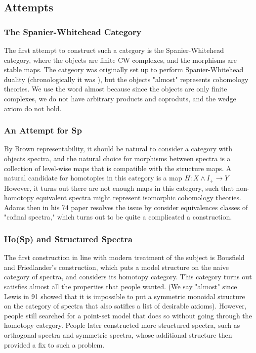 \documentclass{article}
\theoremstyle{definition}
\theoremstyle{definition}
\theoremstyle{definition}
\theoremstyle{definition}
\theoremstyle{definition}
\theoremstyle{definition}
\theoremstyle{definition}
\begin{document}
\subsection{Attempts}

\subsubsection{The Spanier-Whitehead Category}
The first attempt to construct such a category is the Spanier-Whitehead category, where the objects are finite CW complexes, and the morphisms are stable maps. The catgeory was originally set up to perform Spanier-Whitehead duality (chronologically it was ), but the objects "almost" represents cohomology theories. We use the word almost because since the objects are only finite complexes, we do not have arbitrary products and coproduts, and the wedge axiom do not hold. 
\subsubsection{An Attempt for \textrm{Sp}}
By Brown representability, it should be natural to consider a category with objects spectra, and the natural choice for morphisms between spectra is a collection of level-wise maps that is compatible with the structure maps. A natural candidate for homotopies in this category is a map $H: X\wedge I_{+}\to Y$ However, it turns out there are not enough maps in this category, such that non-homotopy equivalent spectra might represent isomorphic cohomology theories. Adams then in his 74 paper resolves the issue by consider equivalences classes of "cofinal spectra," which turns out to be quite a complicated a construction. 

\subsubsection{\textrm{Ho(Sp)} and Structured Spectra}
The first construction in line with modern treatment of the subject is Bousfield and Friedlander's construction, which puts a model structure on the naive category of spectra, and considers its homotopy category. This category turns out satisfies almost all the properties that people wanted. (We say "almost" since Lewis in 91 showed that it is impossible to put a symmetric monoidal structure on the category of spectra that also satifies a list of desirable axioms). However, people still searched for a point-set model that does so without going through the homotopy category.  People later constructed more structured spectra, such as orthogonal spectra and symmetric spectra, whose additional structure then provided a fix to such a problem. 
\end{document}

